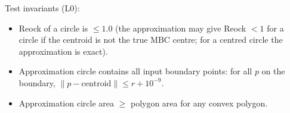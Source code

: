 Test invariants (L0):
\begin{itemize}
  \item Reock of a circle is $\leq 1.0$ (the approximation may give Reock $< 1$
    for a circle if the centroid is not the true MBC centre; for a centred circle
    the approximation is exact).
  \item Approximation circle contains all input boundary points: for all $p$ on the
    boundary, $\|p - \text{centroid}\| \leq r + 10^{-9}$.
  \item Approximation circle area $\geq$ polygon area for any convex polygon.
\end{itemize}
